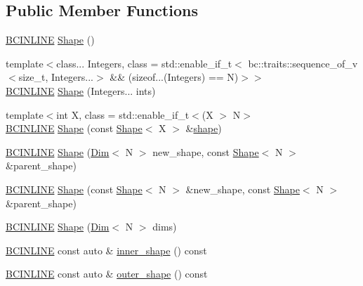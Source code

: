 \subsection*{Public Member Functions}
\begin{DoxyCompactItemize}
\item 
\hyperlink{common_8h_a6699e8b0449da5c0fafb878e59c1d4b1}{B\+C\+I\+N\+L\+I\+NE} \hyperlink{structbc_1_1Shape_a1f9f9b18b122fbee5880a5b6a456781f}{Shape} ()
\item 
{\footnotesize template$<$class... Integers, class  = std\+::enable\+\_\+if\+\_\+t$<$			bc\+::traits\+::sequence\+\_\+of\+\_\+v$<$size\+\_\+t, Integers...$>$ \&\&			(sizeof...(\+Integers) == N)$>$$>$ }\\\hyperlink{common_8h_a6699e8b0449da5c0fafb878e59c1d4b1}{B\+C\+I\+N\+L\+I\+NE} \hyperlink{structbc_1_1Shape_a89c3b942f4818a773c4550cb71075160}{Shape} (Integers... ints)
\item 
{\footnotesize template$<$int X, class  = std\+::enable\+\_\+if\+\_\+t$<$(\+X $>$ N$>$ }\\\hyperlink{common_8h_a6699e8b0449da5c0fafb878e59c1d4b1}{B\+C\+I\+N\+L\+I\+NE} \hyperlink{structbc_1_1Shape_a4bfb7c3ce4b36b3528d31656526a2a7a}{Shape} (const \hyperlink{structbc_1_1Shape}{Shape}$<$ X $>$ \&\hyperlink{namespacebc_a1bc6dec532973ac024c738c0fd32cca3}{shape})
\item 
\hyperlink{common_8h_a6699e8b0449da5c0fafb878e59c1d4b1}{B\+C\+I\+N\+L\+I\+NE} \hyperlink{structbc_1_1Shape_a1ea8742dc5c980c524a2d10eae7b8816}{Shape} (\hyperlink{structbc_1_1Dim}{Dim}$<$ N $>$ new\+\_\+shape, const \hyperlink{structbc_1_1Shape}{Shape}$<$ N $>$ \&parent\+\_\+shape)
\item 
\hyperlink{common_8h_a6699e8b0449da5c0fafb878e59c1d4b1}{B\+C\+I\+N\+L\+I\+NE} \hyperlink{structbc_1_1Shape_a79f445db712d0ee7126413ba57377b34}{Shape} (const \hyperlink{structbc_1_1Shape}{Shape}$<$ N $>$ \&new\+\_\+shape, const \hyperlink{structbc_1_1Shape}{Shape}$<$ N $>$ \&parent\+\_\+shape)
\item 
\hyperlink{common_8h_a6699e8b0449da5c0fafb878e59c1d4b1}{B\+C\+I\+N\+L\+I\+NE} \hyperlink{structbc_1_1Shape_a54d66d5709fc58c31a5d3b29fee03fec}{Shape} (\hyperlink{structbc_1_1Dim}{Dim}$<$ N $>$ dims)
\item 
\hyperlink{common_8h_a6699e8b0449da5c0fafb878e59c1d4b1}{B\+C\+I\+N\+L\+I\+NE} const auto \& \hyperlink{structbc_1_1Shape_a41fcf9207099d9434a7779e53f91d229}{inner\+\_\+shape} () const
\item 
\hyperlink{common_8h_a6699e8b0449da5c0fafb878e59c1d4b1}{B\+C\+I\+N\+L\+I\+NE} const auto \& \hyperlink{structbc_1_1Shape_a693859c37be584f1001ce309067fc165}{outer\+\_\+shape} () const

\end{DoxyCompactItemize}
